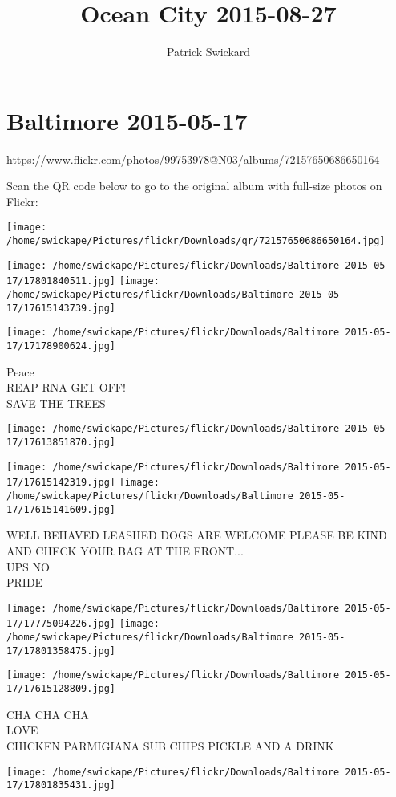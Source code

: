 \documentclass[10pt,letterpaper]{article}
\title{Ocean City 2015-08-27}
\author{Patrick Swickard}
\date{}
\begin{document}
\section*{Baltimore 2015-05-17}

\url{https://www.flickr.com/photos/99753978@N03/albums/72157650686650164}

Scan the QR code below to go to the original album with full-size photos on Flickr:

\texttt{[image: /home/swickape/Pictures/flickr/Downloads/qr/72157650686650164.jpg]}
\pagebreak

\texttt{[image: /home/swickape/Pictures/flickr/Downloads/Baltimore 2015-05-17/17801840511.jpg]}
\texttt{[image: /home/swickape/Pictures/flickr/Downloads/Baltimore 2015-05-17/17615143739.jpg]}

\texttt{[image: /home/swickape/Pictures/flickr/Downloads/Baltimore 2015-05-17/17178900624.jpg]}

Peace\\
REAP RNA GET OFF!\\
SAVE THE TREES
\pagebreak

\texttt{[image: /home/swickape/Pictures/flickr/Downloads/Baltimore 2015-05-17/17613851870.jpg]}

\vspace{0.25in}
\texttt{[image: /home/swickape/Pictures/flickr/Downloads/Baltimore 2015-05-17/17615142319.jpg]}
\texttt{[image: /home/swickape/Pictures/flickr/Downloads/Baltimore 2015-05-17/17615141609.jpg]}

WELL BEHAVED LEASHED DOGS ARE WELCOME PLEASE BE KIND AND CHECK YOUR BAG AT THE FRONT...\\
UPS NO\\
PRIDE
\pagebreak

\texttt{[image: /home/swickape/Pictures/flickr/Downloads/Baltimore 2015-05-17/17775094226.jpg]}
\texttt{[image: /home/swickape/Pictures/flickr/Downloads/Baltimore 2015-05-17/17801358475.jpg]}

\texttt{[image: /home/swickape/Pictures/flickr/Downloads/Baltimore 2015-05-17/17615128809.jpg]}

CHA CHA CHA\\
LOVE\\
CHICKEN PARMIGIANA SUB CHIPS PICKLE AND A DRINK
\pagebreak

\texttt{[image: /home/swickape/Pictures/flickr/Downloads/Baltimore 2015-05-17/17801835431.jpg]}
\end{document}
